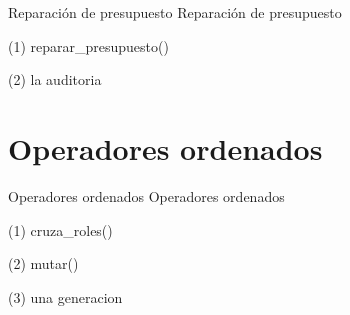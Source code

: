 \begin{frame}{Reparación de presupuesto}
Reparación de presupuesto
\end{frame}

\begin{frame}[fragile]{(1) reparar\_presupuesto()}

\end{frame}

\begin{frame}[fragile]{(2) la auditoria}

\end{frame}


\section{Operadores ordenados}

\begin{frame}{Operadores ordenados}
Operadores ordenados
\end{frame}

\begin{frame}[fragile]{(1) cruza\_roles()}

\end{frame}

\begin{frame}[fragile]{(2) mutar()}

\end{frame}

\begin{frame}[fragile]{(3) una generacion}

\end{frame}


